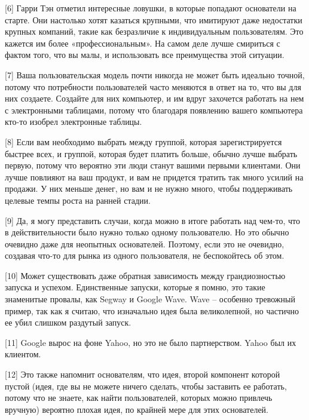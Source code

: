 \documentclass[ebook,12pt,oneside,openany]{memoir}
\begin{document}
[6] Гарри Тэн отметил интересные ловушки, в которые попадают
основатели на старте. Они настолько хотят казаться крупными, что
имитируют даже недостатки крупных компаний, такие как безразличие к
индивидуальным пользователям. Это кажется им более «профессиональным».
На самом деле лучше смириться с фактом того, что вы малы, и
использовать все преимущества этой ситуации. \newline

[7] Ваша пользовательская модель почти никогда не может быть идеально
точной, потому что потребности пользователей часто меняются в ответ на
то, что вы для них создаете. Создайте для них компьютер, и им вдруг
захочется работать на нем с электронными таблицами, потому что
благодаря появлению вашего компьютера кто-то изобрел электронные
таблицы. \newline

[8] Если вам необходимо выбрать между группой, которая
зарегистрируется быстрее всех, и группой, которая будет платить
больше, обычно лучше выбрать первую, потому что вероятно эти люди
станут вашими первыми клиентами. Они лучше повлияют на ваш продукт, и
вам не придется тратить так много усилий на продажи. У них меньше
денег, но вам и не нужно много, чтобы поддерживать целевые темпы роста
на ранней стадии. \newline

[9] Да, я могу представить случаи, когда можно в итоге работать над
чем-то, что в действительности было нужно только одному пользователю.
Но это обычно очевидно даже для неопытных основателей. Поэтому, если
это не очевидно, создавая что-то для рынка из одного пользователя, не
беспокойтесь об этом. \newline

[10] Может существовать даже обратная зависимость между грандиозностью
запуска и успехом. Единственные запуски, которые я помню, это такие
знаменитые провалы, как Segway и Google Wave. Wave – особенно
тревожный пример, так как я считаю, что изначально идея была
великолепной, но частично ее убил слишком раздутый запуск. \newline

[11] Google вырос на фоне Yahoo, но это не было партнерством. Yahoo
был их клиентом. \newline

[12] Это также напомнит основателям, что идея, второй компонент
которой пустой (идея, где вы не можете ничего сделать, чтобы заставить
ее работать, потому что не знаете, как найти пользователей, которых
можно привлечь вручную) вероятно плохая идея, по крайней мере для этих
основателей.
\end{document}
